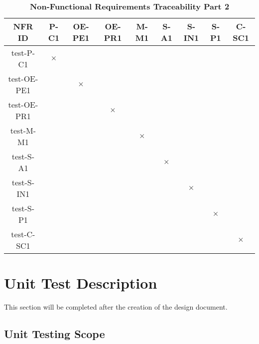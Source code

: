 \documentclass[12pt, titlepage]{article}
\begin{document}
\begin{table}[H]
\centering
\begin{tabular}{|c|c|c|c|c|c|c|c|c|}
\hline
NFR ID & P-C1 & OE-PE1 & OE-PR1 & M-M1 & S-A1 & S-IN1 & S-P1 & C-SC1 \\
\hline 
test-P-C1 & $\times$ & & & & & & &   \\
test-OE-PE1 &  & $\times$  & & & & & &   \\
test-OE-PR1 &  &  & $\times$  & & & & &   \\
test-M-M1 &  & & & $\times$  & & & &   \\
test-S-A1 &  &  & & & $\times$   & & &   \\
test-S-IN1 &  &  & & &    & $\times$ & &   \\
test-S-P1 &  &  & & &    &  & $\times$ &   \\
test-C-SC1 &  &  & & &    &  &  & $\times$  \\
\hline
\end{tabular}
\caption{\bf Non-Functional Requirements Traceability Part 2}
\end{table}

\section{Unit Test Description}

This section will be completed after the creation of the design document.




\subsection{Unit Testing Scope}
\end{document}
